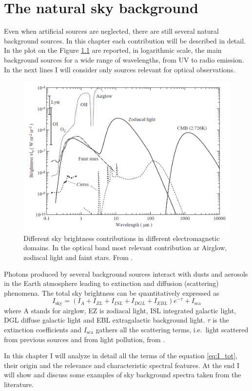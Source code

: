 \chapter{The natural sky background}
Even when artificial sources are neglected, there are still several natural background sources. In this chapter each contribution will be described in detail. In the plot on the Figure \ref{fig:natural_sources} are reported, in logarithmic scale, the main background sources for a wide range of wavelengths, from UV to radio emission. In the next lines I will consider only sources relevant for optical observations.
\begin{figure}
	\centering
	\includegraphics[width=.7\textwidth]{./2_natural_sky/natural_sources}
	\caption{Different sky brightness contributions in different electromagnetic domains. In the optical band most relevant contribution ar Airglow, zodiacal light and faint stars. From \cite{leinert19981997}.\label{fig:natural_sources}}
\end{figure}

Photons produced by several background sources interact with dusts and aerosols in the Earth atmosphere leading to extinction and diffusion (scattering) phenomena. The total sky brightness can be quantitatively expressed as
\begin{equation}\label{eq:I_tot}
I_\text{sky} = (I_A+I_{ZL}+I_{ISL}+I_{DGL}+I_{EBL})e^{-\tau}+I_\text{sca}
\end{equation}
where A stands for airglow, EZ is zodiacal light, ISL integrated galactic light, DGL diffuse galactic light and EBL extragalactic background light. $\tau$ is the extinction coefficients and $I_\text{sca}$ gathers all the scattering terms, i.e.\ light scattered from previous sources and from light pollution, from \cite{leinert19981997}.

\medskip
In this chapter I will analyze in detail all the terms of the equation \eqref{eq:I_tot}, their origin and the relevance and characteristic spectral features. At the end I will show and discuss some examples of sky background spectra taken from the literature.


